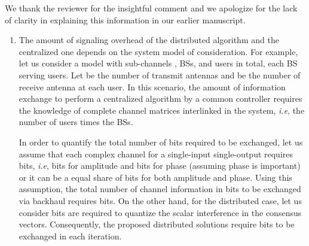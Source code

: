 \begin{enumerate}
 

\resp
	We thank the reviewer for the insightful comment and we apologize for the lack of clarity in explaining this information in our earlier manuscript.
	\begin{enumerate}
		\item The amount of signaling overhead of the distributed algorithm and the centralized one depends on the system model of consideration. For example, let us consider a model with  sub-channels , \acp{BS}, and  users in total, each \ac{BS} serving  users. Let  be the number of transmit antennas and  be the number of receive antenna at each user. In this scenario, the amount of information exchange to perform a centralized algorithm by a common controller requires the knowledge of complete channel matrices interlinked in the system, \textit{i.e}, the number of users times the \acp{BS}. 
		
		In order to quantify the total number of bits required to be exchanged, let us assume that each complex channel for a single-input single-output requires  bits, \textit{i.e},  bits for amplitude and  bits for phase (assuming phase is important) or it can be a equal share of  bits for both amplitude and phase. Using this assumption, the total number of channel information in bits to be exchanged via backhaul requires  bits. On the other hand, for the distributed case, let us consider  bits are required to quantize the scalar interference in the consensus vectors. Consequently, the proposed distributed solutions require  bits to be exchanged in each iteration. 
		

\end{enumerate}
\end{enumerate}
